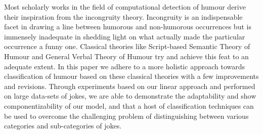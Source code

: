 Most scholarly works in the field of computational detection of humour derive their inspiration from the incongruity theory. Incongruity is an indispensable facet in drawing a line between humorous and non-humorous occurrences but is immensely inadequate in shedding light on what actually made the particular occurrence a funny one. Classical theories like Script-based Semantic Theory of Humour and General Verbal Theory of Humour try and achieve this feat to an adequate extent. In this paper we adhere to a more holistic approach towards classification of humour based on these classical theories with a few improvements and revisions. Through experiments based on our linear approach and performed on large data-sets of jokes, we are able to demonstrate the adaptability and show componentizability of our model, and that a host of classification techniques can be used to overcome the challenging problem of distinguishing between various categories and sub-categories of jokes.
